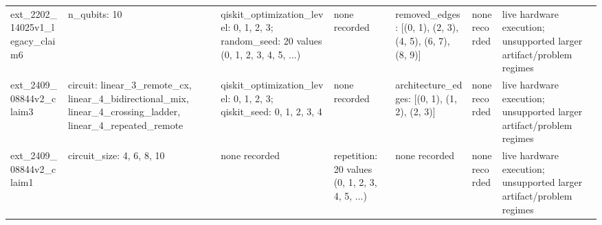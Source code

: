 \begin{table}[t]
{\begin{tabular}{@{}lllllll@{}}
        ext\_2202\_14025v1\_legacy\_claim6 & n\_qubits: 10 & qiskit\_optimization\_level: 0, 1, 2, 3; random\_seed: 20 values (0, 1, 2, 3, 4, 5, ...) & none recorded & removed\_edges: [(0, 1), (2, 3), (4, 5), (6, 7), (8, 9)] & none recorded & live hardware execution; unsupported larger artifact/problem regimes \\
        ext\_2409\_08844v2\_claim3 & circuit: linear\_3\_remote\_cx, linear\_4\_bidirectional\_mix, linear\_4\_crossing\_ladder, linear\_4\_repeated\_remote & qiskit\_optimization\_level: 0, 1, 2, 3; qiskit\_seed: 0, 1, 2, 3, 4 & none recorded & architecture\_edges: [(0, 1), (1, 2), (2, 3)] & none recorded & live hardware execution; unsupported larger artifact/problem regimes \\
        ext\_2409\_08844v2\_claim1 & circuit\_size: 4, 6, 8, 10 & none recorded & repetition: 20 values (0, 1, 2, 3, 4, 5, ...) & none recorded & none recorded & live hardware execution; unsupported larger artifact/problem regimes \\
        \bottomrule
    \end{tabular}
    }
\end{table}
